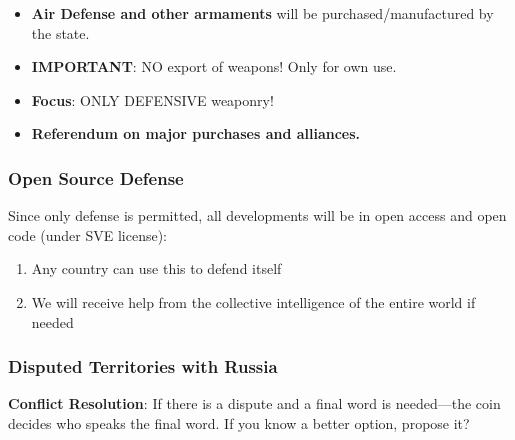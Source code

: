 \documentclass[11pt,a4paper]{article}
\theoremstyle{definition}
\theoremstyle{remark}
\begin{document}
\begin{itemize}
\item \textbf{Air Defense and other armaments} will be purchased/manufactured by the state.
\item \textbf{IMPORTANT}: NO export of weapons! Only for own use.
\item \textbf{Focus}: ONLY DEFENSIVE weaponry!
\item \textbf{Referendum on major purchases and alliances.}
\end{itemize}

\subsubsection{Open Source Defense}

Since only defense is permitted, all developments will be in open access and open code (under SVE license):
\begin{enumerate}
\item Any country can use this to defend itself
\item We will receive help from the collective intelligence of the entire world if needed
\end{enumerate}

\subsubsection{Disputed Territories with Russia}

\begin{center}
\end{center}

\textbf{Conflict Resolution}: If there is a dispute and a final word is needed—the coin decides who speaks the final word. If you know a better option, propose it?
\end{document}
